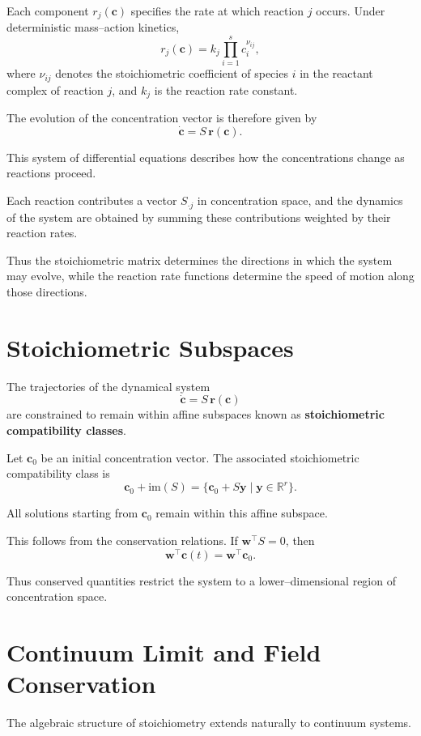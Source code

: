 \documentclass[11pt, openany]{book}
\theoremstyle{plain}
\theoremstyle{definition}
\theoremstyle{remark}
\begin{document}
Each component $r_j(\mathbf{c})$ specifies the rate at which reaction
$j$ occurs. Under deterministic mass–action kinetics,
\[
r_j(\mathbf{c})
=
k_j \prod_{i=1}^{s} c_i^{\nu_{ij}},
\]
where $\nu_{ij}$ denotes the stoichiometric coefficient of species $i$
in the reactant complex of reaction $j$, and $k_j$ is the reaction rate
constant.

The evolution of the concentration vector is therefore given by
\[
\dot{\mathbf{c}}=S\,\mathbf{r}(\mathbf{c}).
\]

This system of differential equations describes how the concentrations
change as reactions proceed.

\medskip

Each reaction contributes a vector $S_{\cdot j}$ in concentration space,
and the dynamics of the system are obtained by summing these
contributions weighted by their reaction rates.

Thus the stoichiometric matrix determines the directions in which the
system may evolve, while the reaction rate functions determine the
speed of motion along those directions.

\section{Stoichiometric Subspaces}

The trajectories of the dynamical system
\[
\dot{\mathbf{c}}=S\,\mathbf{r}(\mathbf{c})
\]
are constrained to remain within affine subspaces known as
\textbf{stoichiometric compatibility classes}.

Let $\mathbf{c}_0$ be an initial concentration vector. The associated
stoichiometric compatibility class is
\[
\mathbf{c}_0+\mathrm{im}(S)
=
\{\mathbf{c}_0+S\mathbf{y}\mid \mathbf{y}\in\mathbb{R}^r\}.
\]

All solutions starting from $\mathbf{c}_0$ remain within this affine
subspace.

This follows from the conservation relations. If
$\mathbf{w}^\top S=0$, then
\[
\mathbf{w}^\top\mathbf{c}(t)=\mathbf{w}^\top\mathbf{c}_0.
\]

Thus conserved quantities restrict the system to a lower–dimensional
region of concentration space.

\section{Continuum Limit and Field Conservation}

The algebraic structure of stoichiometry extends naturally to
continuum systems.
\end{document}
